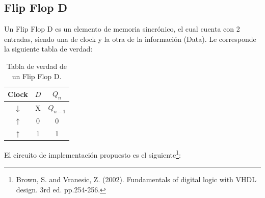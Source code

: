 \subsection{Flip Flop D}

Un Flip Flop D es un elemento de memoria sincrónico, el cual cuenta con 2 entradas, siendo una de clock y la otra de la información (Data). Le corresponde la siguiente tabla de verdad:
\begin{table}[H]
\centering
\begin{tabular}{cc|c}
\hline
\textbf{Clock} & \textbf{$D$} & \textbf{$Q_n$} \\ \hline
$\downarrow$   & X            & $Q_{n-1}$      \\
$\uparrow$     & 0            & 0              \\
$\uparrow$     & 1            & 1             \\
\hline
\end{tabular}
\caption{Tabla de verdad de un Flip Flop D.}
\end{table}

El circuito de implementación propuesto es el siguiente\footnote{Brown, S. and Vranesic, Z. (2002). Fundamentals of digital logic with VHDL design. 3rd ed. pp.254-256.}:

